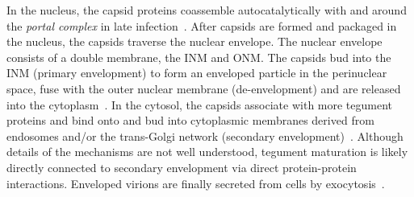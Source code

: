 In the nucleus, the \gls{capsid} proteins coassemble autocatalytically with and around the \emph{portal complex} in late infection~\cite{bainesHerpesSimplexVirus2011a}.
After capsids are formed and packaged in the nucleus, the capsids %
traverse the nuclear envelope.
The nuclear envelope consists of a double membrane, the \gls{INM} and \gls{ONM}.
The \gls{capsid}s bud into the \gls{INM} (primary envelopment) to form an enveloped particle in the perinuclear space, fuse with the outer nuclear membrane (de-envelopment) and are released into the cytoplasm~\cite{skepperHerpesSimplexVirus2001}. %
In the cytosol, the capsids associate with more tegument proteins and bind onto and bud into cytoplasmic membranes derived from endosomes and/or the trans-Golgi network (secondary envelopment)~\cite{mcmillanCytoplasmicDomainHerpes2001,turcotteHerpesSimplexVirus2005}.
Although details of the mechanisms are not well understood, tegument maturation is likely directly connected to secondary envelopment via direct protein-protein interactions.
Enveloped virions are finally secreted from cells by exocytosis~\cite{miranda-saksenaHerpesSimplexVirus2009,hogueCellularMechanismsAlpha2014}.
%

